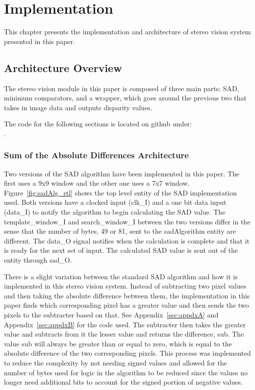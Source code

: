 \chapter{Implementation}
\label{sec:impl}

This chapter presents the implementation and architecture of stereo vision system presented in this paper.

\section{Architecture Overview}

The stereo vision module in this paper is composed of three main parts: SAD, minimum comparators, and a wrapper, which goes around the previous two that takes in image data and outputs disparity values.

The code for the following sections is located on github under:
\\.

\subsection{Sum of the Absolute Differences Architecture}

Two versions of the SAD algorithm have been implemented in this paper. The first uses a 9x9 window and the other one uses a 7x7 window. Figure~\ref{fig:sadAlg_rtl} shows the top level entity of the SAD implementation used. Both versions have a clocked input (clk\_I) and a one bit data input (data\_I) to notify the algorithm to begin calculating the SAD value. The template\_window\_I and search\_window\_I between the two versions differ in the sense that the number of bytes, 49 or 81, sent to the sadAlgorithm entity are different. The data\_O signal notifies when the calculation is complete and that it is ready for the next set of input. The calculated SAD value is sent out of the entity through sad\_O.

There is a slight variation between the standard SAD algorithm and how it is implemented in this stereo vision system. Instead of subtracting two pixel values and then taking the absolute difference between them, the implementation in this paper finds which corresponding pixel has a greater value and then sends the two pixels to the subtracter based on that. See Appendix~\ref{sec:appdxA} and Appendix~\ref{sec:appdxB} for the code used. The subtracter then takes the greater value and subtracts from it the lesser value and returns the difference, sub. The value sub will always be greater than or equal to zero, which is equal to the absolute difference of the two corresponding pixels. This process was implemented to reduce the complexity by not needing signed values and allowed for the number of bytes used for logic in the algorithm to be reduced since the values no longer need additional bits to account for the signed portion of negative values.

